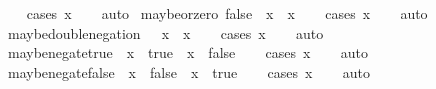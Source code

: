 \begin{isabellebody}
%
\isadelimproof
\ \ %
\endisadelimproof
%
\isatagproof
{}\isamarkupfalse%
\ {\isacharparenleft}cases\ x{\isacharparenright}\isanewline
\ \ \isamarkupfalse%
\ auto%
\endisatagproof
{\isafoldproof}%
%
\isadelimproof
\isanewline
%
\endisadelimproof
\isanewline
{}\isamarkupfalse%
\ maybe{\isacharunderscore}or{\isacharunderscore}zero{\isacharcolon}\ {\isachardoublequoteopen}false\ {\isasymor}\isactrlsub {\isacharquery}\ x\ {\isacharequal}\ x{\isachardoublequoteclose}\isanewline
%
\isadelimproof
\ \ %
\endisadelimproof
%
\isatagproof
{}\isamarkupfalse%
\ {\isacharparenleft}cases\ x{\isacharparenright}\isanewline
\ \ \isamarkupfalse%
\ auto%
\endisatagproof
{\isafoldproof}%
%
\isadelimproof
\isanewline
%
\endisadelimproof
\isanewline
{}\isamarkupfalse%
\ maybe{\isacharunderscore}double{\isacharunderscore}negation{\isacharcolon}\ {\isachardoublequoteopen}{\isasymnot}\isactrlsub {\isacharquery}\ {\isasymnot}\isactrlsub {\isacharquery}\ x\ {\isacharequal}\ x{\isachardoublequoteclose}\isanewline
%
\isadelimproof
\ \ %
\endisadelimproof
%
\isatagproof
{}\isamarkupfalse%
\ {\isacharparenleft}cases\ x{\isacharparenright}\isanewline
\ \ \isamarkupfalse%
\ auto%
\endisatagproof
{\isafoldproof}%
%
\isadelimproof
\isanewline
%
\endisadelimproof
\isanewline
{}\isamarkupfalse%
\ maybe{\isacharunderscore}negate{\isacharunderscore}true{\isacharcolon}\ {\isachardoublequoteopen}{\isacharparenleft}{\isasymnot}\isactrlsub {\isacharquery}\ x\ {\isacharequal}\ true{\isacharparenright}\ {\isacharequal}\ {\isacharparenleft}x\ {\isacharequal}\ false{\isacharparenright}{\isachardoublequoteclose}\isanewline
%
\isadelimproof
\ \ %
\endisadelimproof
%
\isatagproof
{}\isamarkupfalse%
\ {\isacharparenleft}cases\ x{\isacharparenright}\isanewline
\ \ \isamarkupfalse%
\ auto%
\endisatagproof
{\isafoldproof}%
%
\isadelimproof
\isanewline
%
\endisadelimproof
\isanewline
{}\isamarkupfalse%
\ maybe{\isacharunderscore}negate{\isacharunderscore}false{\isacharcolon}\ {\isachardoublequoteopen}{\isacharparenleft}{\isasymnot}\isactrlsub {\isacharquery}\ x\ {\isacharequal}\ false{\isacharparenright}\ {\isacharequal}\ {\isacharparenleft}x\ {\isacharequal}\ true{\isacharparenright}{\isachardoublequoteclose}\isanewline
%
\isadelimproof
\ \ %
\endisadelimproof
%
\isatagproof
{}\isamarkupfalse%
\ {\isacharparenleft}cases\ x{\isacharparenright}\isanewline
\ \ \isamarkupfalse%
\ auto%
\endisatagproof

\end{isabellebody}
